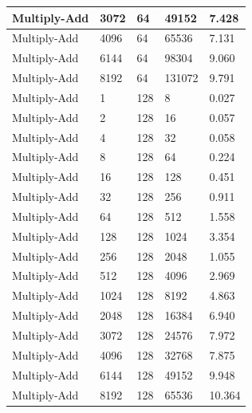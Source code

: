 \documentclass{article}
\begin{document}
\begin{longtable}{|l|l|l|l|l|}
Multiply-Add       & 3072 & 64          & 49152             & 7.428             \\ \hline
Multiply-Add       & 4096 & 64          & 65536             & 7.131             \\ \hline
Multiply-Add       & 6144 & 64          & 98304             & 9.060             \\ \hline
Multiply-Add       & 8192 & 64          & 131072            & 9.791             \\ \hline
Multiply-Add       & 1    & 128         & 8                 & 0.027             \\ \hline
Multiply-Add       & 2    & 128         & 16                & 0.057             \\ \hline
Multiply-Add       & 4    & 128         & 32                & 0.058             \\ \hline
Multiply-Add       & 8    & 128         & 64                & 0.224             \\ \hline
Multiply-Add       & 16   & 128         & 128               & 0.451             \\ \hline
Multiply-Add       & 32   & 128         & 256               & 0.911             \\ \hline
Multiply-Add       & 64   & 128         & 512               & 1.558             \\ \hline
Multiply-Add       & 128  & 128         & 1024              & 3.354             \\ \hline
Multiply-Add       & 256  & 128         & 2048              & 1.055             \\ \hline
Multiply-Add       & 512  & 128         & 4096              & 2.969             \\ \hline
Multiply-Add       & 1024 & 128         & 8192              & 4.863             \\ \hline
Multiply-Add       & 2048 & 128         & 16384             & 6.940             \\ \hline
Multiply-Add       & 3072 & 128         & 24576             & 7.972             \\ \hline
Multiply-Add       & 4096 & 128         & 32768             & 7.875             \\ \hline
Multiply-Add       & 6144 & 128         & 49152             & 9.948             \\ \hline
Multiply-Add       & 8192 & 128         & 65536             & 10.364            \\ \hline

\end{longtable}
\end{document}
